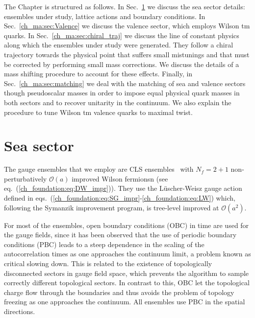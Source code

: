 The Chapter is structured as follows. In Sec.~\ref{ch_ma:sec:Sea} we discuss the sea sector details: ensembles under study, lattice actions and boundary conditions. In Sec.~\ref{ch_ma:sec:Valence} we discuss the valence sector, which employs Wilson tm quarks. In Sec.~\ref{ch_ma:sec:chiral_traj} we discuss the line of constant physics along which the ensembles under study were generated. They follow a chiral trajectory towards the physical point that suffers small mistunings and that must be corrected by performing small mass corrections. We discuss the details of a mass shifting procedure to account for these effects. Finally, in Sec.~\ref{ch_ma:sec:matching} we deal with the matching of sea and valence sectors though pseudoscalar masses in order to impose equal physical quark masses in both sectors and to recover unitarity in the continuum. We also explain the procedure to tune Wilson tm valence quarks to maximal twist.


\section{Sea sector}
\label{ch_ma:sec:Sea}

The gauge ensembles that we employ are CLS ensembles~\citep{Bruno:2014jqa,Mohler:2017wnb} with $N_f=2+1$ non-perturbatively $\mathcal{O}(a)$ improved Wilson fermionsn (see eq.~(\ref{ch_foundation:eq:DW_impr})). They use the Lüscher-Weisz gauge action~\citep{Luscher:1985zq} defined in eqs.~(\ref{ch_foundation:eq:SG_impr}-\ref{ch_foundation:eq:LW}) which, following the Symanzik improvement program, is  tree-level improved at $\mathcal{O}(a^2)$.

For most of the ensembles, open boundary conditions (OBC) in time are
used for the gauge fields, since it has been observed that the use of
periodic boundary conditions (PBC) leads to a steep dependence in the
scaling of  the autocorrelation times as one approaches the continuum
limit, a problem known as critical slowing down. This is related to
the existence of topologically disconnected sectors in gauge field
space, which prevents the algorithm to sample correctly different
topological sectors. In contrast to this, OBC let the topological
charge flow through the boundaries and thus avoids the problem of
topology freezing as one approaches the continuum. All ensembles use PBC in the spatial directions.


